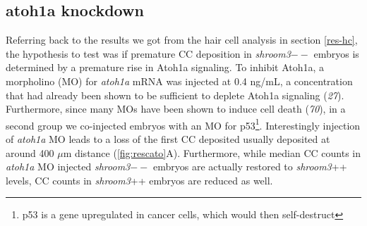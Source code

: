 \documentclass[11pt,singlespacinge,twoside]{reedthesis} %
\begin{document}
\hypertarget{atoh1a-knockdown}{%
\subsection{atoh1a knockdown}\label{atoh1a-knockdown}}

Referring back to the results we got from the hair cell analysis in section \ref{res-hc}, the hypothesis to test was if premature CC deposition in \emph{shroom3}\(--\) embryos is determined by a premature rise in Atoh1a signaling. To inhibit Atoh1a, a morpholino (MO) for \emph{atoh1a} mRNA was injected at 0.4 ng/mL, a concentration that had already been shown to be sufficient to deplete Atoh1a signaling (\emph{27}). Furthermore, since many MOs have been shown to induce cell death (\emph{70}), in a second group we co-injected embryos with an MO for p53\footnote{p53 is a gene upregulated in cancer cells, which would then self-destruct}. Interestingly injection of \emph{atoh1a} MO leads to a loss of the first CC deposited usually deposited at around 400 \(\mu\)m distance (\ref{fig:rescato}A). Furthermore, while median CC counts in \emph{atoh1a} MO injected \emph{shroom3}\(--\) embryos are actually restored to \emph{shroom3}++ levels, CC counts in \emph{shroom3}++ embryos are reduced as well.\newline
\end{document}

